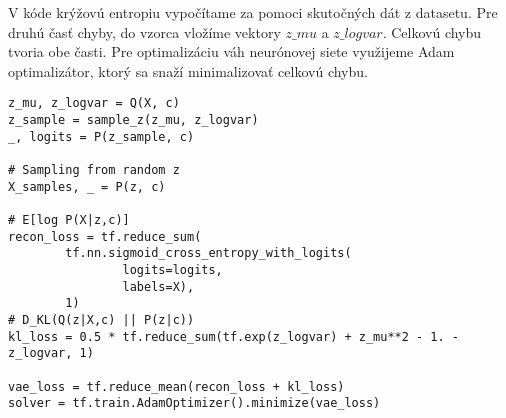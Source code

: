 V kóde krýžovú entropiu vypočítame za pomoci skutočných dát z datasetu.
Pre druhú časť chyby, do vzorca vložíme vektory \(z\_mu\) a \(z\_logvar\).
Celkovú chybu tvoria obe časti.
Pre optimalizáciu váh neurónovej siete využijeme Adam optimalizátor, ktorý sa snaží minimalizovať celkovú chybu.
\begin{verbatim}
z_mu, z_logvar = Q(X, c)
z_sample = sample_z(z_mu, z_logvar)
_, logits = P(z_sample, c)

# Sampling from random z
X_samples, _ = P(z, c)

# E[log P(X|z,c)]
recon_loss = tf.reduce_sum(
		tf.nn.sigmoid_cross_entropy_with_logits(
				logits=logits, 
				labels=X), 
		1)
# D_KL(Q(z|X,c) || P(z|c))
kl_loss = 0.5 * tf.reduce_sum(tf.exp(z_logvar) + z_mu**2 - 1. - z_logvar, 1)

vae_loss = tf.reduce_mean(recon_loss + kl_loss)
solver = tf.train.AdamOptimizer().minimize(vae_loss)
\end{verbatim}
